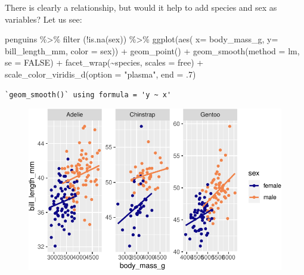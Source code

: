\documentclass[
  letterpaper,
  DIV=11,
  numbers=noendperiod]{scrreprt}
\newenvironment{Shaded}{\begin{snugshade}}{\end{snugshade}}
\newcommand{\AttributeTok}[1]{\textcolor[rgb]{0.40,0.45,0.13}{#1}}
\newcommand{\ConstantTok}[1]{\textcolor[rgb]{0.56,0.35,0.01}{#1}}
\newcommand{\DecValTok}[1]{\textcolor[rgb]{0.68,0.00,0.00}{#1}}
\newcommand{\FunctionTok}[1]{\textcolor[rgb]{0.28,0.35,0.67}{#1}}
\newcommand{\NormalTok}[1]{\textcolor[rgb]{0.00,0.23,0.31}{#1}}
\newcommand{\SpecialCharTok}[1]{\textcolor[rgb]{0.37,0.37,0.37}{#1}}
\newcommand{\StringTok}[1]{\textcolor[rgb]{0.13,0.47,0.30}{#1}}
\begin{document}
There is clearly a relationship, but would it help to add species and
sex as variables? Let us see:

\begin{Shaded}
\begin{Highlighting}[]
\NormalTok{penguins }\SpecialCharTok{\%\textgreater{}\%} \FunctionTok{filter}\NormalTok{ (}\SpecialCharTok{!}\FunctionTok{is.na}\NormalTok{(sex)) }\SpecialCharTok{\%\textgreater{}\%} \FunctionTok{ggplot}\NormalTok{(}\FunctionTok{aes}\NormalTok{( }\AttributeTok{x=}\NormalTok{ body\_mass\_g, }\AttributeTok{y=}\NormalTok{ bill\_length\_mm, }\AttributeTok{color =}\NormalTok{ sex)) }\SpecialCharTok{+}
  \FunctionTok{geom\_point}\NormalTok{() }\SpecialCharTok{+}
  \FunctionTok{geom\_smooth}\NormalTok{(}\AttributeTok{method =}\NormalTok{ lm, }\AttributeTok{se =} \ConstantTok{FALSE}\NormalTok{) }\SpecialCharTok{+}
  \FunctionTok{facet\_wrap}\NormalTok{(}\SpecialCharTok{\textasciitilde{}}\NormalTok{species, }\AttributeTok{scales =} \StringTok{\textquotesingle{}free\textquotesingle{}}\NormalTok{) }\SpecialCharTok{+}
  \FunctionTok{scale\_color\_viridis\_d}\NormalTok{(}\AttributeTok{option =} \StringTok{"plasma"}\NormalTok{, }\AttributeTok{end =}\NormalTok{ .}\DecValTok{7}\NormalTok{)}
\end{Highlighting}
\end{Shaded}

\begin{verbatim}
`geom_smooth()` using formula = 'y ~ x'
\end{verbatim}

\begin{figure}[H]

{\centering \includegraphics{./10-model_selection_files/figure-pdf/unnamed-chunk-24-1.pdf}

}

\end{figure}
\end{document}
